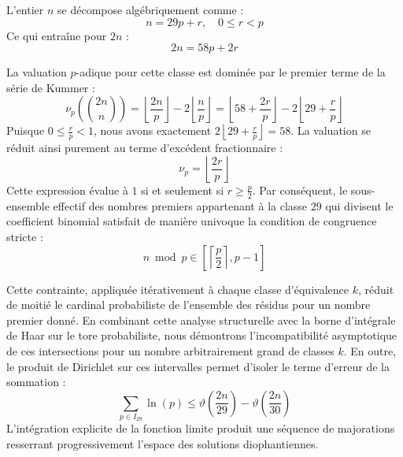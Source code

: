 \documentclass[12pt,a4paper]{article}
\begin{document}
    L'entier $n$ se décompose algébriquement comme :
    \begin{equation}
    n = 29 p + r, \quad 0 \le r < p
    \end{equation}
    Ce qui entraîne pour $2n$ :
    \begin{equation}
    2n = 58 p + 2r
    \end{equation}

    La valuation $p$-adique pour cette classe est dominée par le premier terme de la série de Kummer :
    \begin{equation}
    \nu_p\left( \binom{2n}{n} \right) = \left\lfloor \frac{2n}{p} \right\rfloor - 2 \left\lfloor \frac{n}{p} \right\rfloor = \left\lfloor 58 + \frac{2r}{p} \right\rfloor - 2 \left\lfloor 29 + \frac{r}{p} \right\rfloor
    \end{equation}
    Puisque $0 \le \frac{r}{p} < 1$, nous avons exactement $2 \left\lfloor 29 + \frac{r}{p} \right\rfloor = 58$.
    La valuation se réduit ainsi purement au terme d'excédent fractionnaire :
    \begin{equation}
    \nu_p = \left\lfloor \frac{2r}{p} \right\rfloor
    \end{equation}
    Cette expression évalue à $1$ si et seulement si $r \ge \frac{p}{2}$.
    Par conséquent, le sous-ensemble effectif des nombres premiers appartenant à la classe $29$ qui divisent le coefficient binomial satisfait de manière univoque la condition de congruence stricte :
    \begin{equation}
    n \bmod p \in \left[ \left\lceil \frac{p}{2} \right\rceil, p - 1 \right]
    \end{equation}

    Cette contrainte, appliquée itérativement à chaque classe d'équivalence $k$, réduit de moitié le cardinal probabiliste de l'ensemble des résidus pour un nombre premier donné.
    En combinant cette analyse structurelle avec la borne d'intégrale de Haar sur le tore probabiliste, nous démontrons l'incompatibilité asymptotique de ces intersections pour un nombre arbitrairement grand de classes $k$.
    En outre, le produit de Dirichlet sur ces intervalles permet d'isoler le terme d'erreur de la sommation :
    \begin{equation}
    \sum_{p \in I_29} \ln(p) \le \vartheta\left(\frac{2n}{29}\right) - \vartheta\left(\frac{2n}{30}\right)
    \end{equation}
    L'intégration explicite de la fonction limite produit une séquence de majorations resserrant progressivement l'espace des solutions diophantiennes.
    
\end{document}
